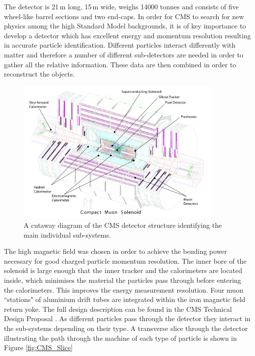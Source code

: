 The detector is 21\,m long, 15\,m wide, weighs 14000 tonnes and consists of five wheel-like barrel sections and two end-caps. In order for CMS to search for new physics among the high Standard Model backgrounds, it is of key importance to develop a detector which has excellent energy and momentum resolution resulting in accurate particle identification. Different particles interact differently with matter and therefore a number of different sub-detectors are needed in order to gather all the relative information. These data are then combined in order to reconstruct the objects. 

\begin{figure}[htbp]
\centering
\includegraphics[width=0.9\textwidth]{Figures/Detector/CMS_Structure}
\caption{A cutaway diagram of the CMS detector structure identifying the main individual sub-systems.}
\label{fig:CMS_Struct}
\end{figure}

The high magnetic field was chosen in order to achieve the bending power necessary for good charged particle momentum resolution. The inner bore of the solenoid is large enough that the inner tracker and the calorimeters are located inside, which minimises the material the particles pass through before entering the calorimeters. This improves the energy measurement resolution. Four muon ``stations" of aluminium drift tubes are integrated within the iron magnetic field return yoke. The full design description can be found in the CMS Technical Design Proposal \cite{CMSTDP}. As different particles pass through the detector they interact in the sub-systems depending on their type. A transverse slice through the detector illustrating the path through the machine of each type of particle is shown in Figure \ref{fig:CMS_Slice} 





